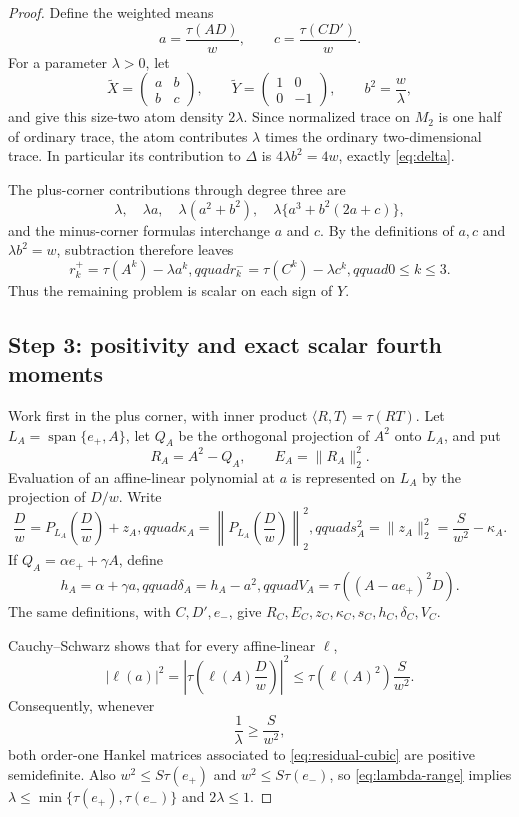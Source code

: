 \documentclass[11pt]{article}
\newcommand{\Span}{\operatorname{span}}
\newcommand{\ip}[2]{\langle #1,#2\rangle}
\begin{document}
\begin{proof}
Define the weighted means
\[
 a=\frac{\tau(AD)}w,\qquad c=\frac{\tau(CD')}w.
\]
For a parameter $\lambda>0$, let
\[
 \widetilde X=\begin{pmatrix}a&b\\b&c\end{pmatrix},\qquad
 \widetilde Y=\begin{pmatrix}1&0\\0&-1\end{pmatrix},\qquad
 b^2=\frac w\lambda,
\]
and give this size-two atom density $2\lambda$.  Since normalized trace on
$M_2$ is one half of ordinary trace, the atom contributes $\lambda$ times
the ordinary two-dimensional trace.  In particular its contribution to
$\Delta$ is $4\lambda b^2=4w$, exactly \eqref{eq:delta}.

The plus-corner contributions through degree three are
\[
 \lambda,\quad \lambda a,\quad \lambda(a^2+b^2),\quad
 \lambda\{a^3+b^2(2a+c)\},
\]
and the minus-corner formulas interchange $a$ and $c$.  By the definitions
of $a,c$ and $\lambda b^2=w$, subtraction therefore leaves
\begin{equation}\label{eq:residual-cubic}
 r_k^+=\tau(A^k)-\lambda a^k,qquad
 r_k^-=\tau(C^k)-\lambda c^k,qquad 0\leq k\leq3.
\end{equation}
Thus the remaining problem is scalar on each sign of $Y$.

\subsection*{Step 3: positivity and exact scalar fourth moments}

Work first in the plus corner, with inner product
$\ip{R}{T}=\tau(RT)$.  Let $L_A=\Span\{e_+,A\}$, let $Q_A$ be the
orthogonal projection of $A^2$ onto $L_A$, and put
\[
 R_A=A^2-Q_A,\qquad E_A=\|R_A\|_2^2.
\]
Evaluation of an affine-linear polynomial at $a$ is represented on $L_A$ by
the projection of $D/w$.  Write
\[
 \frac Dw=P_{L_A}\!\left(\frac Dw\right)+z_A,qquad
 \kappa_A=\left\|P_{L_A}\!\left(\frac Dw\right)\right\|_2^2,qquad
 s_A^2=\|z_A\|_2^2=\frac S{w^2}-\kappa_A.
\]
If $Q_A=\alpha e_++\gamma A$, define
\[
 h_A=\alpha+\gamma a,qquad \delta_A=h_A-a^2,qquad
 V_A=\tau((A-ae_+)^2D).
\]
The same definitions, with $C,D',e_-$, give
$R_C,E_C,z_C,\kappa_C,s_C,h_C,\delta_C,V_C$.

Cauchy--Schwarz shows that for every affine-linear $\ell$,
\[
 |\ell(a)|^2
 =\left|\tau\left(\ell(A)\frac Dw\right)\right|^2
 \leq \tau(\ell(A)^2)\frac S{w^2}.
\]
Consequently, whenever
\begin{equation}\label{eq:lambda-range}
 \frac1\lambda\geq\frac S{w^2},
\end{equation}
both order-one Hankel matrices associated to \eqref{eq:residual-cubic} are
positive semidefinite.  Also $w^2\leq S\tau(e_+)$ and
$w^2\leq S\tau(e_-)$, so \eqref{eq:lambda-range} implies
$\lambda\leq\min\{\tau(e_+),\tau(e_-)\}$ and $2\lambda\leq1$.


\end{proof}
\end{document}
